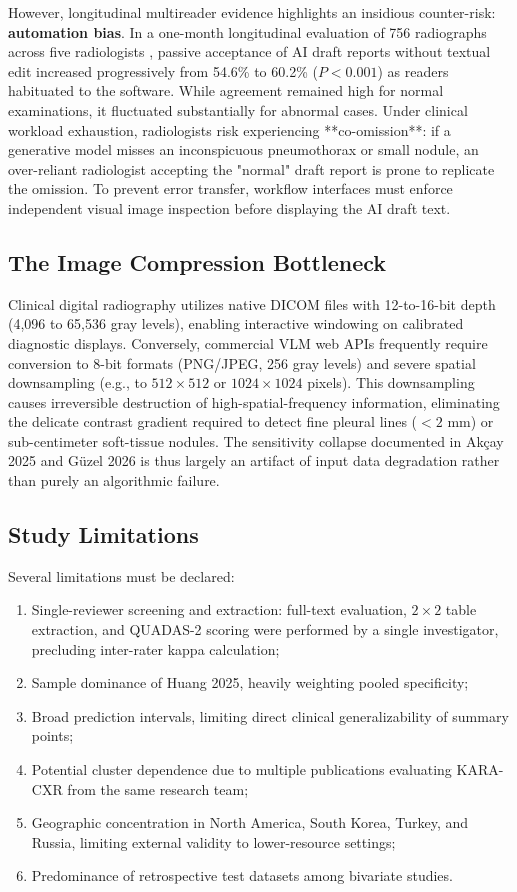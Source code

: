 \documentclass[preprint,11pt]{elsarticle}
\begin{document}
However, longitudinal multireader evidence highlights an insidious counter-risk: \textbf{automation bias}. In a one-month longitudinal evaluation of 756 radiographs across five radiologists \cite{hongjacr}, passive acceptance of AI draft reports without textual edit increased progressively from 54.6\% to 60.2\% ($P < 0.001$) as readers habituated to the software. While agreement remained high for normal examinations, it fluctuated substantially for abnormal cases. Under clinical workload exhaustion, radiologists risk experiencing **co-omission**: if a generative model misses an inconspicuous pneumothorax or small nodule, an over-reliant radiologist accepting the "normal" draft report is prone to replicate the omission. To prevent error transfer, workflow interfaces must enforce independent visual image inspection before displaying the AI draft text.

\subsection{The Image Compression Bottleneck}
Clinical digital radiography utilizes native DICOM files with 12-to-16-bit depth (4,096 to 65,536 gray levels), enabling interactive windowing on calibrated diagnostic displays. Conversely, commercial VLM web APIs frequently require conversion to 8-bit formats (PNG/JPEG, 256 gray levels) and severe spatial downsampling (e.g., to $512 \times 512$ or $1024 \times 1024$ pixels). This downsampling causes irreversible destruction of high-spatial-frequency information, eliminating the delicate contrast gradient required to detect fine pleural lines ($<2$ mm) or sub-centimeter soft-tissue nodules. The sensitivity collapse documented in Ak\c{c}ay 2025 \cite{akcay} and Güzel 2026 \cite{guzel} is thus largely an artifact of input data degradation rather than purely an algorithmic failure.

\subsection{Study Limitations}
Several limitations must be declared:
\begin{enumerate}
    \item Single-reviewer screening and extraction: full-text evaluation, $2\times 2$ table extraction, and QUADAS-2 scoring were performed by a single investigator, precluding inter-rater kappa calculation;
    \item Sample dominance of Huang 2025, heavily weighting pooled specificity;
    \item Broad prediction intervals, limiting direct clinical generalizability of summary points;
    \item Potential cluster dependence due to multiple publications evaluating KARA-CXR from the same research team;
    \item Geographic concentration in North America, South Korea, Turkey, and Russia, limiting external validity to lower-resource settings;
    \item Predominance of retrospective test datasets among bivariate studies.
\end{enumerate}
\end{document}
